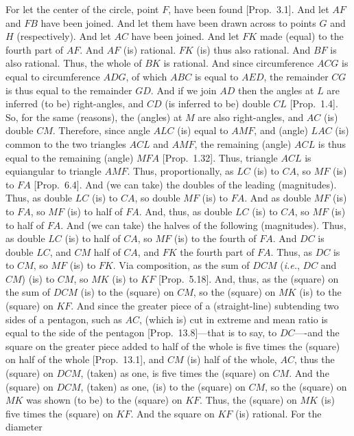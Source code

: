 For let the center of the circle, point $F$, have been found [Prop.~3.1].
And let $AF$ and $FB$ have been joined. And let them have been drawn
across to points $G$ and $H$ (respectively). And let $AC$ have been joined.
And let $FK$ made (equal) to the fourth part of $AF$. And $AF$ (is) rational. $FK$ (is) thus also rational. And $BF$ is also rational. Thus,
the whole of $BK$ is rational. And since circumference $ACG$ is equal
to circumference $ADG$, of which $ABC$ is equal to $AED$, the
remainder $CG$ is thus equal to the remainder $GD$.
And if we join $AD$ then the angles at $L$ are inferred (to be) right-angles, 
and $CD$ (is inferred to be) double $CL$ [Prop.~1.4].  So, for the same (reasons), 
the (angles) at $M$ are also right-angles, and $AC$ (is) double $CM$. Therefore,
since angle $ALC$ (is) equal to $AMF$, and (angle) $LAC$ (is) common
to the two triangles $ACL$ and $AMF$, the remaining (angle) $ACL$ is thus
equal to the remaining (angle) $MFA$ [Prop.~1.32]. Thus, triangle 
$ACL$  is equiangular to triangle $AMF$. Thus, proportionally, 
as $LC$ (is) to $CA$, so $MF$ (is) to $FA$ [Prop.~6.4]. And (we can take) the
doubles of the leading (magnitudes). Thus, as double $LC$ (is) to $CA$,
so double $MF$ (is) to $FA$. And as double $MF$ (is) to $FA$, so
$MF$ (is) to half of $FA$. And, thus, as double $LC$ (is) to $CA$,
so $MF$ (is) to half of $FA$. And (we can take) the halves of the following
(magnitudes). Thus, as double $LC$ (is) to half of $CA$, so $MF$
(is) to the fourth of $FA$. And $DC$ is double $LC$, and  $CM$ half
of $CA$, and $FK$ the fourth part of $FA$.  Thus, as $DC$
is to $CM$, so $MF$ (is) to $FK$. Via composition, as the
sum of $DCM$ ({\em i.e.}, $DC$ and $CM$)
(is) to $CM$, so $MK$ (is) to $KF$ [Prop.~5.18]. And, thus, as the (square) on the
sum of $DCM$ (is) to the (square) on $CM$, so the (square) on $MK$
(is) to the (square) on $KF$. And since the
greater piece of a (straight-line) subtending two sides of a
pentagon, such as $AC$, (which is) cut in extreme and mean ratio is equal to the side of the pentagon [Prop.~13.8]---that is to say,
to $DC$----and the square on the greater piece added to half of the
whole is five times the (square) on half of the whole [Prop.~13.1], 
and $CM$ (is) half of the whole, $AC$, thus the (square) on
$DCM$, (taken) as one, is five times the (square) on $CM$.
And the (square) on $DCM$, (taken) as one,  (is)  to the (square) on $CM$, so the (square) on $MK$ was shown (to be) to the (square) on 
$KF$.  Thus, the (square) on $MK$ (is) five times the (square) on 
$KF$. And the square on $KF$ (is) rational. For the diameter
